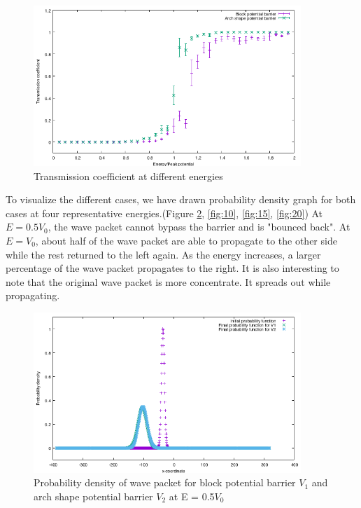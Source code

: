 \documentclass{article}
\begin{document}
\begin{figure}[H]
  \centering
  \includegraphics[width=0.9\textwidth]{Transmission_coefficient.png}
  \caption{Transmission coefficient at different energies}
  \label{fig:T-E}
\end{figure}

To visualize the different cases, we have drawn probability
density graph for both cases at four representative energies.(Figure
\ref{fig:05}, \ref{fig:10}, \ref{fig:15}, \ref{fig:20}) At $E = 0.5
  V_0$, the wave packet cannot bypass the barrier and is "bounced
back". At $E = V_0$, about half of the wave packet are able to
propagate to the other side while the rest returned to the left
again. As the energy increases, a larger percentage of the wave
packet propagates to the right. It is also interesting to note that
the original wave packet is more concentrate. It spreads out while
propagating.

\begin{figure}[H]
  \centering
  \includegraphics[width=0.9\textwidth]{case05.png}
  \caption{Probability density of wave packet for block potential barrier $V_1$ and arch shape potential barrier $V_2$ at E = 0.5$V_0$}
  \label{fig:05}
\end{figure}
\end{document}
